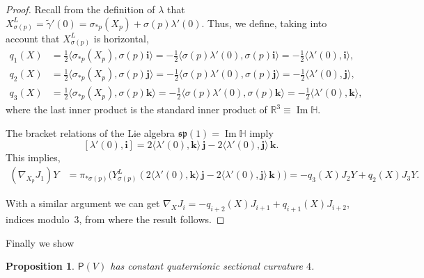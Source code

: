 \documentclass[12pt, a4paper]{amsart}
\newcommand{\g}{\mathfrak}
\newcommand{\R}{\mathbb{R}}
\renewcommand{\H}{\mathbb{H}}
\renewcommand{\Im}{\operatorname{Im}}
\newtheorem{proposition}[theorem]{Proposition}
\theoremstyle{remark}
\begin{document}
\begin{proof}
Recall from the definition of $\lambda$ that 
$X_{\sigma(p)}^L=\tilde{\gamma}'(0)=\sigma_{*p}(X_p)+\sigma(p)\lambda'(0)$.
Thus, we define, taking into account that $X_{\sigma(p)}^L$ is horizontal,
\[
\begin{aligned}
q_1(X)&{}=\frac{1}{2}\langle\sigma_{*p}(X_p),\sigma(p)\mathbf{i}\rangle
=-\frac{1}{2}\langle \sigma(p)\lambda'(0),\sigma(p)\mathbf{i}\rangle
=-\frac{1}{2}\langle \lambda'(0),\mathbf{i}\rangle,\\
q_2(X)&{}=\frac{1}{2}\langle\sigma_{*p}(X_p),\sigma(p)\mathbf{j}\rangle
=-\frac{1}{2}\langle \sigma(p)\lambda'(0),\sigma(p)\mathbf{j}\rangle
=-\frac{1}{2}\langle \lambda'(0),\mathbf{j}\rangle,\\
q_3(X)&{}=\frac{1}{2}\langle\sigma_{*p}(X_p),\sigma(p)\mathbf{k}\rangle
=-\frac{1}{2}\langle \sigma(p)\lambda'(0),\sigma(p)\mathbf{k}\rangle
=-\frac{1}{2}\langle \lambda'(0),\mathbf{k}\rangle,
\end{aligned}
\]
where the last inner product is the standard inner product of $\R^3\equiv\Im\H$.

The bracket relations of the Lie algebra $\g{sp}(1)=\Im\H$ imply
\[
[\lambda'(0),\mathbf{i}]
=2\langle\lambda'(0),\mathbf{k}\rangle\,\mathbf{j}-2\langle\lambda'(0),\mathbf{j}\rangle\,\mathbf{k}.
\]
This implies,
\[
\begin{aligned}
(\nabla_{X_p}J_1)Y
&{}=\pi_{*\sigma(p)}\bigl(Y_{\sigma(p)}^L(2\langle\lambda'(0),\mathbf{k}\rangle\,\mathbf{j}-2\langle\lambda'(0),\mathbf{j}\rangle\,\mathbf{k})\bigr)
=-q_3(X)J_2 Y+q_2(X)J_3 Y.
\end{aligned}
\]

With a similar argument we can get $\nabla_X J_i=-q_{i+2}(X)J_{i+1}+q_{i+1}(X)J_{i+2}$, indices modulo~3, from where the result follows.
\end{proof}

Finally we show

\begin{proposition}
$\mathsf{P}(V)$ has constant quaternionic sectional curvature $4$.
\end{proposition}
\end{document}
